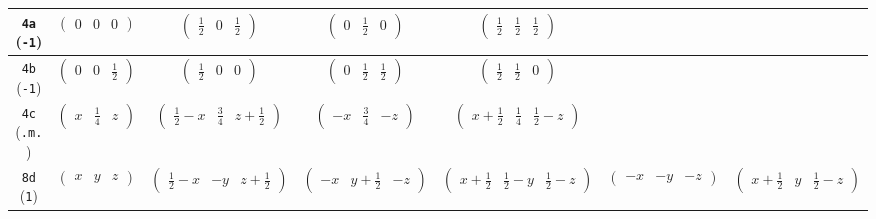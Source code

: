 \documentclass[fleqn,9pt,landscape]{jsarticle}
\begin{document}
\begin{center}
\begin{longtable}{ccccccc}
{\tt 4a} ({\tt -1}) & $ \begin{pmatrix} 0 & 0 & 0 \end{pmatrix} $ & $ \begin{pmatrix} \frac{1}{2} & 0 & \frac{1}{2} \end{pmatrix} $ & $ \begin{pmatrix} 0 & \frac{1}{2} & 0 \end{pmatrix} $ & $ \begin{pmatrix} \frac{1}{2} & \frac{1}{2} & \frac{1}{2} \end{pmatrix} $ & $  $ & $  $ \\ \hline
{\tt 4b} ({\tt -1}) & $ \begin{pmatrix} 0 & 0 & \frac{1}{2} \end{pmatrix} $ & $ \begin{pmatrix} \frac{1}{2} & 0 & 0 \end{pmatrix} $ & $ \begin{pmatrix} 0 & \frac{1}{2} & \frac{1}{2} \end{pmatrix} $ & $ \begin{pmatrix} \frac{1}{2} & \frac{1}{2} & 0 \end{pmatrix} $ & $  $ & $  $ \\ \hline
{\tt 4c} ({\tt .m.}) & $ \begin{pmatrix} x & \frac{1}{4} & z \end{pmatrix} $ & $ \begin{pmatrix} \frac{1}{2} - x & \frac{3}{4} & z + \frac{1}{2} \end{pmatrix} $ & $ \begin{pmatrix} - x & \frac{3}{4} & - z \end{pmatrix} $ & $ \begin{pmatrix} x + \frac{1}{2} & \frac{1}{4} & \frac{1}{2} - z \end{pmatrix} $ & $  $ & $  $ \\ \hline
{\tt 8d} ({\tt 1}) & $ \begin{pmatrix} x & y & z \end{pmatrix} $ & $ \begin{pmatrix} \frac{1}{2} - x & - y & z + \frac{1}{2} \end{pmatrix} $ & $ \begin{pmatrix} - x & y + \frac{1}{2} & - z \end{pmatrix} $ & $ \begin{pmatrix} x + \frac{1}{2} & \frac{1}{2} - y & \frac{1}{2} - z \end{pmatrix} $ & $ \begin{pmatrix} - x & - y & - z \end{pmatrix} $ & $ \begin{pmatrix} x + \frac{1}{2} & y & \frac{1}{2} - z \end{pmatrix} $ \\

\end{longtable}
\end{center}
\end{document}
